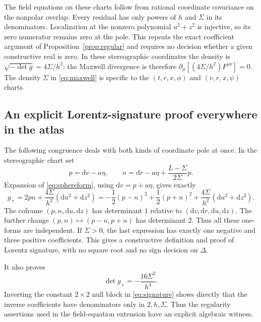 \documentclass[11pt,a4paper]{article}
\numberwithin{equation}{section}
\theoremstyle{definition}\newtheorem{definition}[theorem]{Definition}
\theoremstyle{remark}\newtheorem{remark}[theorem]{Remark}
\newcommand{\dd}{\mathrm{d}}
\begin{document}
The field equations on these charts follow from rational coordinate covariance on the nonpolar overlap. Every residual has only powers of $h$ and $\Sigma$ in its denominators. Localization at the nonzero polynomial $u^2+z^2$ is injective, so its zero numerator remains zero at the pole. This repeats the exact coefficient argument of Proposition~\ref{prop:regular} and requires no decision whether a given constructive real is zero. In these stereographic coordinates the density is $\sqrt{-\det g}=4\Sigma/h^2$; the Maxwell divergence is therefore $\partial_\mu[(4\Sigma/h^2)F^{\mu\nu}]=0$. The density $\Sigma$ in \eqref{eq:maxwell} is specific to the $(t,r,x,\phi)$ and $(v,r,x,\psi)$ charts.

\subsection{An explicit Lorentz-signature proof everywhere in the atlas}
The following congruence deals with both kinds of coordinate pole at once. In the stereographic chart set
\begin{equation}\label{eq:nullcoframe}
 p=\dd v-a\eta,\qquad
 n=\dd r-a\eta+\frac{L-\Sigma}{2\Sigma}p.
\end{equation}
Expansion of \eqref{eq:sphereform}, using $\dd v=p+a\eta$, gives exactly
\begin{equation}\label{eq:signature}
 g_+=2pn+\frac{4\Sigma}{h^2}(\dd u^2+\dd z^2)
 =-\frac12(p-n)^2+\frac12(p+n)^2
    +\frac{4\Sigma}{h^2}(\dd u^2+\dd z^2).
\end{equation}
The coframe $(p,n,\dd u,\dd z)$ has determinant $1$ relative to $(\dd v,\dd r,\dd u,\dd z)$. The further change $(p,n)\mapsto(p-n,p+n)$ has determinant $2$. Thus all these one-forms are independent. If $\Sigma>0$, the last expression has exactly one negative and three positive coefficients. This gives a constructive definition and proof of Lorentz signature, with no square root and no sign decision on $\Delta$.

It also proves
\begin{equation}\label{eq:stereodet}
 \det g_+=-\frac{16\Sigma^2}{h^4}.
\end{equation}
Inverting the constant $2\times2$ null block in \eqref{eq:signature} shows directly that the inverse coefficients have denominators only in $2,h,\Sigma$. Thus the regularity assertions used in the field-equation extension have an explicit algebraic witness.
\end{document}
